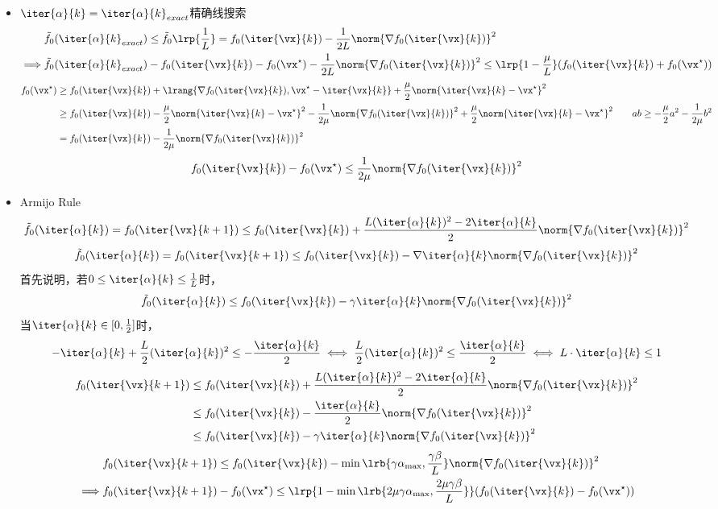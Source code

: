 \begin{itemize}
\item $\iter{\alpha}{k}=\iter{\alpha}{k}_{exact}$精确线搜索
\[\begin{aligned}
    &\tilde{f}_0(\iter{\alpha}{k}_{exact})\leq\tilde{f}_0\lrp{\frac{1}{L}}=f_0(\iter{\vx}{k})-\frac{1}{2L}\norm{\nabla f_0(\iter{\vx}{k})}^2\\
    \implies&\tilde{f}_0(\iter{\alpha}{k}_{exact})-f_0(\iter{\vx}{k})-f_0(\vx^\star)-\frac{1}{2L}\norm{\nabla f_0(\iter{\vx}{k})}^2
    \leq \lrp{1-\frac{\mu}{L}}(f_0(\iter{\vx}{k})+f_0(\vx^\star))
\end{aligned}\]
\[\begin{aligned}
    f_0(\vx^\star)&\geq f_0(\iter{\vx}{k})+\lrang{\nabla f_0(\iter{\vx}{k}),\vx^\star-\iter{\vx}{k}}+\frac{\mu}{2}\norm{\iter{\vx}{k}-\vx^\star}^2\\
    &\geq f_0(\iter{\vx}{k})-\frac{\mu}{2}\norm{\iter{\vx}{k}-\vx^\star}^2-\frac{1}{2\mu}\norm{\nabla f_0(\iter{\vx}{k})}^2+\frac{\mu}{2}\norm{\iter{\vx}{k}-\vx^\star}^2\qquad ab\geq-\frac{\mu}{2}a^2-\frac{1}{2\mu}b^2\\
    &= f_0(\iter{\vx}{k})-\frac{1}{2\mu}\norm{\nabla f_0(\iter{\vx}{k})}^2
\end{aligned}\]
\[f_0(\iter{\vx}{k})-f_0(\vx^\star)\leq\frac{1}{2\mu}\norm{\nabla f_0(\iter{\vx}{k})}^2\]

\item Armijo Rule
\[\tilde{f}_0(\iter{\alpha}{k})=f_0(\iter{\vx}{k+1})\leq f_0(\iter{\vx}{k})+\frac{L(\iter{\alpha}{k})^2-2\iter{\alpha}{k}}{2}\norm{\nabla f_0(\iter{\vx}{k})}^2\]
\[\tilde{f}_0(\iter{\alpha}{k})=f_0(\iter{\vx}{k+1})\leq f_0(\iter{\vx}{k})-\nabla\iter{\alpha}{k}\norm{\nabla f_0(\iter{\vx}{k})}^2\]
首先说明，若$0\leq\iter{\alpha}{k}\leq\frac{1}{L}$时，
\[\tilde{f}_0(\iter{\alpha}{k})\leq f_0(\iter{\vx}{k})-\gamma\iter{\alpha}{k}\norm{\nabla f_0(\iter{\vx}{k})}^2\]
当$\iter{\alpha}{k}\in[0,\frac{1}{2}]$时，
\[-\iter{\alpha}{k}+\frac{L}{2}(\iter{\alpha}{k})^2\leq -\frac{\iter{\alpha}{k}}{2}\iff \frac{L}{2}(\iter{\alpha}{k})^2\leq\frac{\iter{\alpha}{k}}{2}\iff L\cdot\iter{\alpha}{k}\leq 1\]
\[\begin{aligned}
    f_0(\iter{\vx}{k+1})&\leq f_0(\iter{\vx}{k})+\frac{L(\iter{\alpha}{k})^2-2\iter{\alpha}{k}}{2}\norm{\nabla f_0(\iter{\vx}{k})}^2\\
    &\leq f_0(\iter{\vx}{k})-\frac{\iter{\alpha}{k}}{2}\norm{\nabla f_0(\iter{\vx}{k})}^2\\
    &\leq f_0(\iter{\vx}{k})-\gamma\iter{\alpha}{k}\norm{\nabla f_0(\iter{\vx}{k})}^2
\end{aligned}\]
\[\begin{aligned}
    &f_0(\iter{\vx}{k+1})\leq f_0(\iter{\vx}{k})-\min\lrb{\gamma\alpha_{\max},\frac{\gamma\beta}{L}}\norm{\nabla f_0(\iter{\vx}{k})}^2\\
    \implies& f_0(\iter{\vx}{k+1})-f_0(\vx^\star)\leq\lrp{1-\min\lrb{2\mu\gamma\alpha_{\max},\frac{2\mu\gamma\beta}{L}}}(f_0(\iter{\vx}{k})-f_0(\vx^\star))
\end{aligned}\]
\end{itemize}

